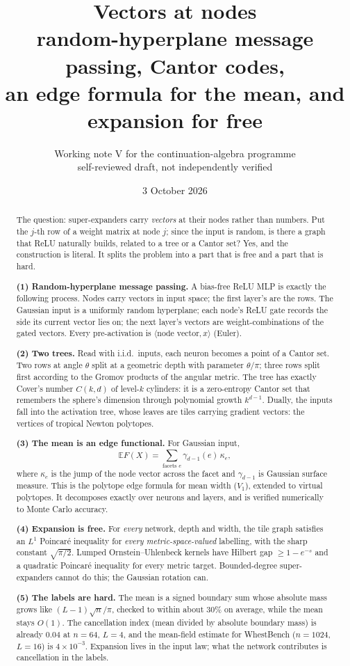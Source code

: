 \documentclass[11pt]{article}
\title{Vectors at nodes\\[4pt]
\large random-hyperplane message passing, Cantor codes,\\ an edge formula for the mean, and expansion for free}
\author{Working note V for the continuation-algebra programme\\
\small self-reviewed draft, not independently verified}
\date{3 October 2026}
\theoremstyle{definition}
\theoremstyle{remark}
\newcommand{\E}{\mathbb E}
\begin{document}
\maketitle

\begin{abstract}
The question: super-expanders carry \emph{vectors} at their nodes rather than numbers. Put the $j$-th row of a weight matrix at node $j$; since the input is random, is there a graph that ReLU naturally builds, related to a tree or a Cantor set? Yes, and the construction is literal. It splits the problem into a part that is free and a part that is hard.

\textbf{(1) Random-hyperplane message passing.} A bias-free ReLU MLP is exactly the following process. Nodes carry vectors in input space; the first layer's are the rows. The Gaussian input is a uniformly random hyperplane; each node's ReLU gate records the side its current vector lies on; the next layer's vectors are weight-combinations of the gated vectors. Every pre-activation is $\langle\text{node vector},x\rangle$ (Euler).

\textbf{(2) Two trees.} Read with i.i.d.\ inputs, each neuron becomes a point of a Cantor set. Two rows at angle $\theta$ split at a geometric depth with parameter $\theta/\pi$; three rows split first according to the Gromov products of the angular metric. The tree has exactly Cover's number $C(k,d)$ of level-$k$ cylinders: it is a zero-entropy Cantor set that remembers the sphere's dimension through polynomial growth $k^{d-1}$. Dually, the inputs fall into the activation tree, whose leaves are tiles carrying gradient vectors: the vertices of tropical Newton polytopes.

\textbf{(3) The mean is an edge functional.} For Gaussian input,
\[\E F(X)=\sum_{\text{facets }e}\gamma_{d-1}(e)\,\kappa_e ,\]
where $\kappa_e$ is the jump of the node vector across the facet and $\gamma_{d-1}$ is Gaussian surface measure. This is the polytope edge formula for mean width ($V_1$), extended to virtual polytopes. It decomposes exactly over neurons and layers, and is verified numerically to Monte Carlo accuracy.

\textbf{(4) Expansion is free.} For \emph{every} network, depth and width, the tile graph satisfies an $L^1$ Poincar\'e inequality for \emph{every metric-space-valued} labelling, with the sharp constant $\sqrt{\pi/2}$. Lumped Ornstein--Uhlenbeck kernels have Hilbert gap $\ge 1-e^{-s}$ and a quadratic Poincar\'e inequality for every metric target. Bounded-degree super-expanders cannot do this; the Gaussian rotation can.

\textbf{(5) The labels are hard.} The mean is a signed boundary sum whose absolute mass grows like $(L-1)\sqrt n/\pi$, checked to within about $30\%$ on average, while the mean stays $O(1)$. The cancellation index (mean divided by absolute boundary mass) is already $0.04$ at $n=64$, $L=4$, and the mean-field estimate for WhestBench ($n=1024$, $L=16$) is $4\times10^{-3}$. Expansion lives in the input law; what the network contributes is cancellation in the labels.
\end{abstract}
\end{document}
